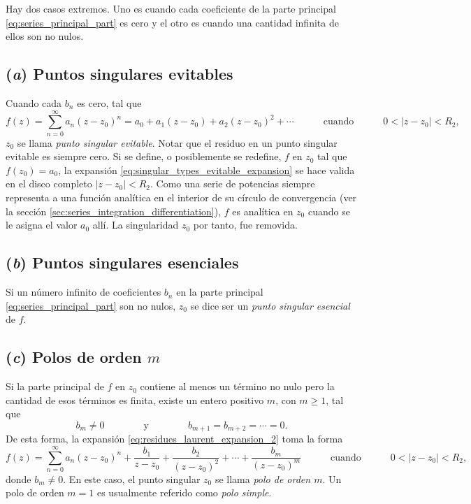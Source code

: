 \documentclass[a4paper]{report}
\begin{document}
Hay dos casos extremos. Uno es cuando cada coeficiente de la parte principal \ref{eq:series_principal_part} es cero y el otro es cuando una cantidad infinita de ellos son no nulos.

\subsection*{(\textit{a}) Puntos singulares evitables}

Cuando cada \(b_n\) es cero, tal que 
\begin{equation}\label{eq:singular_types_evitable_expansion}
  f(z)=\sum_{n=0}^\infty a_n(z-z_0)^n=a_0+a_1(z-z_0)+a_2(z-z_0)^2+\cdots
  \qquad\quad\textrm{cuando}\quad\qquad
  0<|z-z_0|<R_2, 
\end{equation}
\(z_0\) se llama \emph{punto singular evitable}. Notar que el residuo en un punto singular evitable es siempre cero. Si se define, o posiblemente se redefine, \(f\) en \(z_0\) tal que \(f(z_0)=a_0\), la expansión \ref{eq:singular_types_evitable_expansion} se hace valida en el disco completo \(|z-z_0|<R_2\). Como una serie de potencias siempre representa a una función analítica en el interior de su círculo de convergencia (ver la sección \ref{sec:series_integration_differentiation}), \(f\) es analítica en \(z_0\) cuando se le asigna el valor \(a_0\) allí. La singularidad \(z_0\) por tanto, fue removida.

\subsection*{(\textit{b}) Puntos singulares esenciales}

Si un número infinito de coeficientes \(b_n\) en la parte principal \ref{eq:series_principal_part} son no nulos, \(z_0\) se dice ser un \emph{punto singular esencial} de \(f\).

\subsection*{(\textit{c}) Polos de orden \(m\)}

Si la parte principal de \(f\) en \(z_0\) contiene al menos un término no nulo pero la cantidad de esos términos es finita, existe un entero positivo \(m\), con \(m\geq1\), tal que 
\[
 b_m\neq0
 \qquad\qquad\textrm{y}\qquad\qquad
 b_{m+1}=b_{m+2}=\cdots=0.
\]
De esta forma, la expansión \ref{eq:residues_laurent_expansion_2} toma la forma 
\[
  f(z)=\sum_{n=0}^\infty a_n(z-z_0)^n+\frac{b_1}{z-z_0}+\frac{b_2}{(z-z_0)^2}+\cdots+\frac{b_m}{(z-z_0)^m} 
  \qquad\quad\textrm{cuando}\quad\qquad
  0<|z-z_0|<R_2,
\]
donde \(b_m\neq0\). En este caso, el punto singular \(z_0\) se llama \emph{polo de orden \(m\)}. Un polo de orden \(m=1\) es usualmente referido como \emph{polo simple}.
\end{document}
